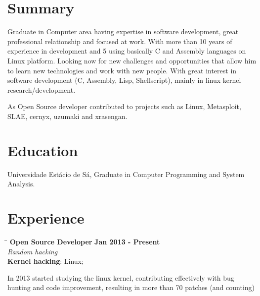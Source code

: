 \documentclass[margin]{res}
\begin{document}

\address{Juazeiro do Norte, CE, Brazil \\
  \href{mailto:geyslan@gmail.com}{geyslan@gmail.com} \\ Phone: 55 88 99617 0441
  \\ Postal Code: 63034-100 }


\begin{resume}

  \section{Summary} Graduate in Computer area having expertise in software
  development, great professional relationship and focused at work.
  With more than 10 years of experience in development and 5 using
  basically C and Assembly languages on Linux platform. Looking now
  for new challenges and opportunities that allow him to learn new
  technologies and work with new people. With great interest in
  software development (C, Assembly, Lisp, Shellscript), mainly in
  linux kernel research/development.

  As Open Source developer contributed to projects such as Linux,
  Metasploit, SLAE, cernyx, uzumaki and xrasengan.

  \section{Education} Universidade Estácio de Sá, Graduate in Computer
  Programming and System Analysis.

\section{Experience}

\vspace{-0.1in}
\begin{tabbing}
  \hspace{2.3in}\= \hspace{1.7in}\= \kill %
  \textbf{Open Source Developer}    \>\>\textbf{Jan 2013 - Present}\\
  \textit{Random hacking}\\
  \textbf{Kernel hacking}: Linux;
\end{tabbing}\vspace{-20pt}      %
\vspace{2mm} In 2013 started studying the linux kernel, contributing
effectively with bug hunting and code improvement, resulting in more
than 70 patches (and counting)


\end{resume}
\end{document}
